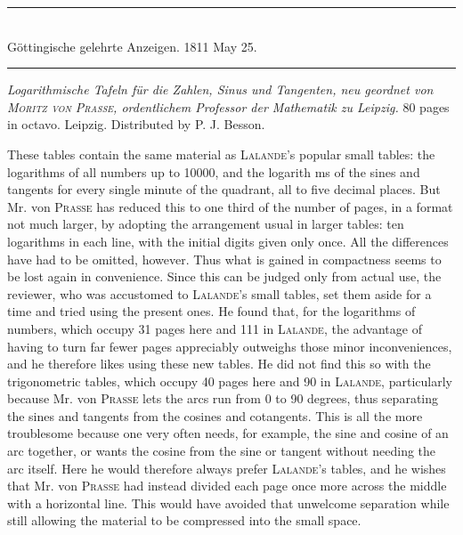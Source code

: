\begin{center}
\rule{0.60\linewidth}{0.3pt}\\
Göttingische gelehrte Anzeigen. 1811 May 25.\\
\rule{0.60\linewidth}{0.3pt}
\end{center}

\textit{Logarithmische Tafeln für die Zahlen, Sinus und Tangenten, neu geordnet
von \textup{\textsc{Moritz von Prasse}}, ordentlichem Professor der Mathematik zu Leipzig.} 80 pages in octavo. Leipzig. Distributed by P. J. Besson.

These tables contain the same material as \textsc{Lalande}'s popular small tables: the logarithms of all numbers up to 10000, and the logarith%
ms of the sines and tangents for every single minute of the quadrant, all to five decimal places. But Mr. von \textsc{Prasse} has reduced this to one third of the number of pages, in a format not much larger, by adopting the arrangement usual in larger tables: ten logarithms in each line, with the initial digits given only once. All the differences have had to be omitted, however. Thus what is gained in compactness seems to be lost again in convenience. Since this can be judged only from actual use, the reviewer, who was accustomed to \textsc{Lalande}'s small tables, set them aside for a time and tried using the present ones. He found that, for the logarithms of numbers, which occupy 31 pages here and 111 in \textsc{Lalande}, the advantage of having to turn far fewer pages appreciably outweighs those minor inconveniences, and he therefore likes using these new tables. He did not find this so with the trigonometric tables, which occupy 40 pages here and 90 in \textsc{Lalande}, particularly because Mr. von \textsc{Prasse} lets the arcs run from 0 to 90 degrees, thus separating the sines and tangents from the cosines and cotangents. This is all the more troublesome because one very often needs, for example, the sine and cosine of an arc together, or wants the cosine from the sine or tangent without needing the arc itself. Here he would therefore always prefer \textsc{Lalande}'s tables, and he wishes that Mr. von \textsc{Prasse} had instead divided each page once more across the middle with a horizontal line. This would have avoided that unwelcome separation while still allowing the material to be compressed into the small space.

